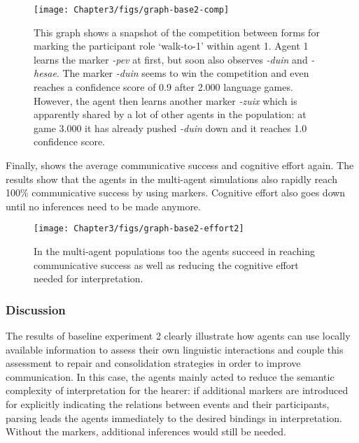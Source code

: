 \begin{figure}[t]
\centerline{\texttt{[image: Chapter3/figs/graph-base2-comp]}}
  \caption[Baseline experiment 2: snapshot of competition (equal frequency)]{This graph shows a snapshot of the competition between forms for marking the participant role `walk-to-1' within agent 1. Agent 1 learns the marker {\em -pev} at first, but soon also observes {\em -duin} and {\em -hesae}. The marker {\em -duin} seems to win the competition and even reaches a confidence score of 0.9 after 2.000 language games. However, the agent then learns another marker {\em -zuix} which is apparently shared by a lot of other agents in the population: at game 3.000 it has already pushed {\em -duin} down and it reaches 1.0 confidence score.}
   \label{f:base2-comp}
\end{figure}



Finally,  shows the average communicative success and cognitive effort again. The results show that the agents in the multi-agent simulations also rapidly reach 100\% communicative success by using markers. Cognitive effort also goes down until no inferences need to be made anymore.

\begin{figure} 
\centerline{\texttt{[image: Chapter3/figs/graph-base2-effort2]}}
  \caption[Baseline experiment 2: success and effort (equal frequency)]{In the multi-agent populations too the agents succeed in reaching communicative success as well as reducing the cognitive effort needed for interpretation.}
   \label{f:base2-effort2}
\end{figure}

\subsubsection{Discussion}
 The results of baseline experiment 2 clearly illustrate how agents can use locally available information to assess their own linguistic interactions and couple this assessment to repair and consolidation strategies in order to improve communication. In this case, the agents mainly acted to reduce the semantic complexity of interpretation for the hearer: if additional markers are introduced for explicitly indicating the relations between events and their participants, parsing leads the agents immediately to the desired bindings in interpretation. Without the markers, additional inferences would still be needed.

